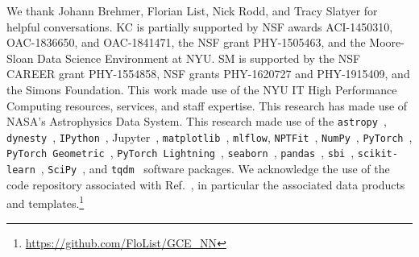 \documentclass[prd,aps,10pt,nofootinbib,twocolumn,superscriptaddress,preprintnumbers,balancelastpage,longbibliography]{revtex4-1}
\begin{document}
\vspace{.3cm}

\begin{acknowledgments}

We thank Johann Brehmer, Florian List, Nick Rodd, and Tracy Slatyer for helpful conversations.  
KC is partially supported by NSF awards ACI-1450310, OAC-1836650, and OAC-1841471, the NSF grant PHY-1505463, and the Moore-Sloan Data Science Environment at NYU. 
SM is supported by the NSF CAREER grant PHY-1554858, NSF grants PHY-1620727 and PHY-1915409, and the Simons Foundation. 
This work made use of the NYU IT High Performance Computing resources, services, and staff expertise. 
This research has made use of NASA's Astrophysics Data System. 
This research made use of the \texttt{astropy}~\cite{Price-Whelan:2018hus,Robitaille:2013mpa}, \texttt{dynesty}~\cite{Speagle_2020}, \texttt{IPython}~\cite{PER-GRA:2007}, Jupyter~\cite{Kluyver2016JupyterN}, \texttt{matplotlib}~\cite{Hunter:2007}, \texttt{mlflow}, \texttt{NPTFit}~\cite{Mishra-Sharma:2016gis}, \texttt{NumPy}~\cite{numpy:2011}, \texttt{PyTorch}~\cite{NEURIPS2019_9015}, \texttt{PyTorch Geometric}~\cite{Fey/Lenssen/2019}, \texttt{PyTorch Lightning}~\cite{william_falcon_2020_3828935}, \texttt{seaborn}~\cite{seaborn}, \texttt{pandas}~\cite{pandas:2010}, \texttt{sbi}~\cite{tejero-cantero2020sbi}, \texttt{scikit-learn}~\cite{scikit-learn}, \texttt{SciPy}~\cite{2020SciPy-NMeth}, and \texttt{tqdm}~\cite{da2019tqdm}  software packages. We acknowledge the use of the code repository associated with Ref.~\cite{List:2020mzd}, in particular the associated data products and templates.\footnote{\url{https://github.com/FloList/GCE_NN}}
\end{acknowledgments}





\end{document}
